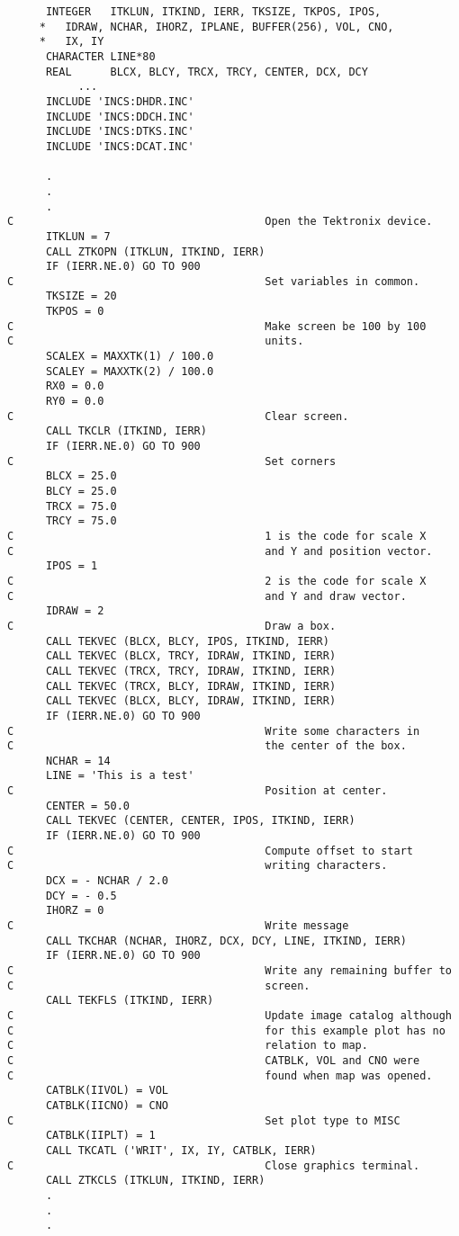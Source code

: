\begin{verbatim}
      INTEGER   ITKLUN, ITKIND, IERR, TKSIZE, TKPOS, IPOS,
     *   IDRAW, NCHAR, IHORZ, IPLANE, BUFFER(256), VOL, CNO,
     *   IX, IY
      CHARACTER LINE*80
      REAL      BLCX, BLCY, TRCX, TRCY, CENTER, DCX, DCY
           ...
      INCLUDE 'INCS:DHDR.INC'
      INCLUDE 'INCS:DDCH.INC'
      INCLUDE 'INCS:DTKS.INC'
      INCLUDE 'INCS:DCAT.INC'

      .
      .
      .
C                                       Open the Tektronix device.
      ITKLUN = 7
      CALL ZTKOPN (ITKLUN, ITKIND, IERR)
      IF (IERR.NE.0) GO TO 900
C                                       Set variables in common.
      TKSIZE = 20
      TKPOS = 0
C                                       Make screen be 100 by 100
C                                       units.
      SCALEX = MAXXTK(1) / 100.0
      SCALEY = MAXXTK(2) / 100.0
      RX0 = 0.0
      RY0 = 0.0
C                                       Clear screen.
      CALL TKCLR (ITKIND, IERR)
      IF (IERR.NE.0) GO TO 900
C                                       Set corners
      BLCX = 25.0
      BLCY = 25.0
      TRCX = 75.0
      TRCY = 75.0
C                                       1 is the code for scale X
C                                       and Y and position vector.
      IPOS = 1
C                                       2 is the code for scale X
C                                       and Y and draw vector.
      IDRAW = 2
C                                       Draw a box.
      CALL TEKVEC (BLCX, BLCY, IPOS, ITKIND, IERR)
      CALL TEKVEC (BLCX, TRCY, IDRAW, ITKIND, IERR)
      CALL TEKVEC (TRCX, TRCY, IDRAW, ITKIND, IERR)
      CALL TEKVEC (TRCX, BLCY, IDRAW, ITKIND, IERR)
      CALL TEKVEC (BLCX, BLCY, IDRAW, ITKIND, IERR)
      IF (IERR.NE.0) GO TO 900
C                                       Write some characters in
C                                       the center of the box.
      NCHAR = 14
      LINE = 'This is a test'
C                                       Position at center.
      CENTER = 50.0
      CALL TEKVEC (CENTER, CENTER, IPOS, ITKIND, IERR)
      IF (IERR.NE.0) GO TO 900
C                                       Compute offset to start
C                                       writing characters.
      DCX = - NCHAR / 2.0
      DCY = - 0.5
      IHORZ = 0
C                                       Write message
      CALL TKCHAR (NCHAR, IHORZ, DCX, DCY, LINE, ITKIND, IERR)
      IF (IERR.NE.0) GO TO 900
C                                       Write any remaining buffer to
C                                       screen.
      CALL TEKFLS (ITKIND, IERR)
C                                       Update image catalog although
C                                       for this example plot has no
C                                       relation to map.
C                                       CATBLK, VOL and CNO were
C                                       found when map was opened.
      CATBLK(IIVOL) = VOL
      CATBLK(IICNO) = CNO
C                                       Set plot type to MISC
      CATBLK(IIPLT) = 1
      CALL TKCATL ('WRIT', IX, IY, CATBLK, IERR)
C                                       Close graphics terminal.
      CALL ZTKCLS (ITKLUN, ITKIND, IERR)
      .
      .
      .


\end{verbatim}
